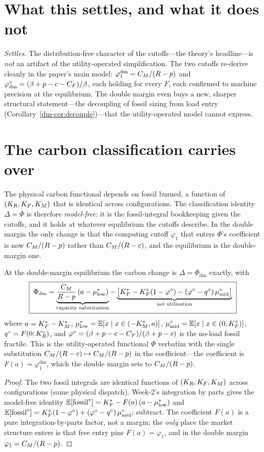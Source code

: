 \section{What this settles, and what it does not}
\emph{Settles.} The distribution-free character of the cutoffs---the theory's headline---is
\emph{not} an artifact of the utility-operated simplification. The two cutoffs re-derive
cleanly in the paper's main model: $\varphi_1^{\mathrm{dm}}=C_M/(R-p)$ and
$\varphi^{\circ}_{\mathrm{dm}}=(\beta+p-c-C_F)/\beta$, each holding for every $F$, each confirmed to machine
precision at the equilibrium. The double margin even buys a new, sharper structural
statement---the decoupling of fossil sizing from load entry (Corollary~\ref{dm-cor:decouple})---that
the utility-operated model cannot express.

\section{The carbon classification carries over}
The physical carbon functional depends on fossil burned, a function of $(K_R,K_F,K_M)$ that is
identical across configurations. The classification identity $\Delta=\Phi$ is therefore
\emph{model-free}: it is the fossil-integral bookkeeping given the cutoffs, and it holds at
whatever equilibrium the cutoffs describe. In the double margin the only change is that the
computing cutoff $\varphi_1$ that enters $\Phi$'s coefficient is now $C_M/(R-p)$ rather than
$C_M/(R-c)$, and the equilibrium is the double-margin one.
\begin{theorem}\label{dm-prop:dmidentity}
At the double-margin equilibrium the carbon change is $\Delta=\Phi_{\mathrm{dm}}$ exactly, with
\[
  \boxed{\;\Phi_{\mathrm{dm}}
  =\underbrace{\frac{C_M}{R-p}\,(a-\mu^{*}_{\mathrm{low}})}_{\text{capacity substitution}}
  -\underbrace{\big[K_F^{*}-K_F^{\circ}(1-\varphi^{\circ})-(\varphi^{\circ}-q^{\circ})\,\mu^{\circ}_{\mathrm{mid}}\big]}_{\text{net utilization}}\;}
\]
where $a=K_F^{*}-K_M^{*}$, $\mu^{*}_{\mathrm{low}}=\mathbb{E}[x\mid x\in(-K_M^{*},a)]$,
$\mu^{\circ}_{\mathrm{mid}}=\mathbb{E}[x\mid x\in(0,K_F^{\circ})]$, $q^{\circ}=F(0;K_R^{\circ})$, and
$\varphi^{\circ}=(\beta+p-c-C_F)/(\beta+p-c)$ is the no-load fossil fractile. This is the utility-operated
functional $\Phi$ verbatim with the single substitution
$C_M/(R-c)\mapsto C_M/(R-p)$ in the coefficient---the coefficient is $F(a)=\varphi_1^{\mathrm{dm}}$,
which the double margin sets to $C_M/(R-p)$.
\end{theorem}
\begin{proof}
The two fossil integrals are identical functions of $(K_R,K_F,K_M)$ across configurations
(same physical dispatch). Week-2's integration by parts gives the model-free identity
$\mathbb{E}[\mathrm{fossil}^{*}]=K_F^{*}-F(a)\,(a-\mu^{*}_{\mathrm{low}})$ and
$\mathbb{E}[\mathrm{fossil}^{\circ}]=K_F^{\circ}(1-\varphi^{\circ})+(\varphi^{\circ}-q^{\circ})\,\mu^{\circ}_{\mathrm{mid}}$; subtract.
The coefficient $F(a)$ is a pure integration-by-parts factor, not a margin; the \emph{only}
place the market structure enters is that free entry pins $F(a)=\varphi_1$, and in the double
margin $\varphi_1=C_M/(R-p)$.
\end{proof}

